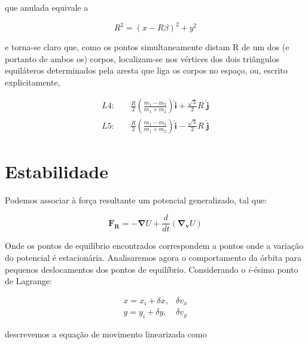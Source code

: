 que anulada equivale a

\begin{equation}
    R^2=(x-R\beta)^2+y^2
\end{equation}

e torna-se claro que, como os pontos simultaneamente distam R de um dos (e portanto de ambos os) corpos, localizam-se nos vértices dos dois triângulos equiláteros determinados pela aresta que liga os corpos no espaço, ou, escrito explicitamente,

\begin{align}
    L4: & \quad \frac{R}{2}\left(\frac{m_1 - m_2}{m_1 + m_2}\right)\mathbf{\hat{i}} +\frac{\sqrt{3}}{2}R\;\mathbf{\hat{j}} \\
    L5: & \quad \frac{R}{2}\left(\frac{m_1 - m_2}{m_1 + m_2}\right)\mathbf{\hat{i}}  -\frac{\sqrt{3}}{2}R\;\mathbf{\hat{j}}
\end{align}

\section{Estabilidade}

Podemos associar à força resultante um potencial generalizado, tal que:

\begin{equation}
\mathbf{F_R} = -\boldsymbol{\nabla} U + \frac{d}{dt}(\boldsymbol{\nabla _v}U)
\end{equation}

Onde os pontos de equilíbrio encontrados correspondem a pontos onde a variação do potencial é estacionária. Analisaremos agora o comportamento da órbita para pequenos deslocamentos dos pontos de equilíbrio. Considerando o $i$-ésimo ponto de Lagrange:

\begin{eqnarray}
x = x_i + \delta x, & \delta v_x \\
y = y_i + \delta y, & \delta v_y
\end{eqnarray}

descrevemos a equação de movimento linearizada como

